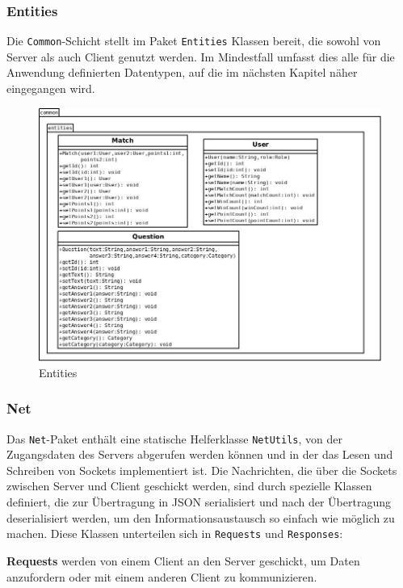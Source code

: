 \subsubsection{Entities}
Die \texttt{Common}-Schicht stellt im Paket \texttt{Entities} Klassen bereit, die sowohl von Server als auch Client genutzt werden. Im Mindestfall umfasst dies alle für die Anwendung definierten Datentypen, auf die im nächsten Kapitel näher eingegangen wird.

\begin{figure}[H]
	\centering
	\begin{minipage}[t]{\textwidth}
		\includegraphics[width=1\textwidth]{Diagramme/entities.jpeg}
		\caption{Entities}
		\label{Entities}
	\end{minipage}
\end{figure}

\newpage
\subsubsection{Net}
Das \texttt{Net}-Paket enthält eine statische Helferklasse \texttt{NetUtils}, von der Zugangsdaten des Servers abgerufen werden können und in der das Lesen und Schreiben von Sockets implementiert ist. Die Nachrichten, die über die Sockets zwischen Server und Client geschickt werden, sind durch spezielle Klassen definiert, die zur Übertragung in JSON serialisiert und nach der Übertragung deserialisiert werden, um den Informationsaustausch so einfach wie möglich zu machen. Diese Klassen unterteilen sich in \texttt{Requests} und \texttt{Responses}:

\textbf{Requests} werden von einem Client an den Server geschickt, um Daten anzufordern oder mit einem anderen Client zu kommunizieren. 

